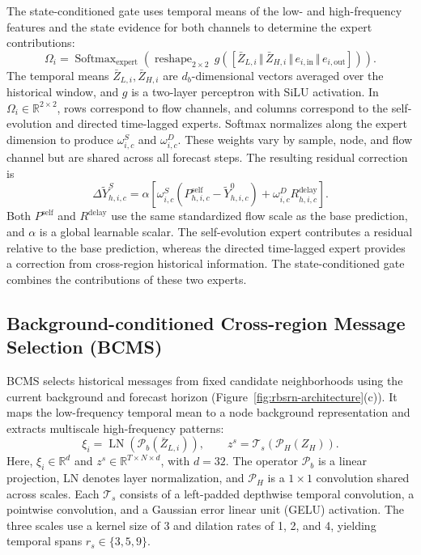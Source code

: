 The state-conditioned gate uses temporal means of the low- and high-frequency features and the state evidence for both channels to determine the expert contributions:
\begin{equation}
\label{eq:role-gate}
\Omega_i=\operatorname{Softmax}_{\mathrm{expert}}\!\left(
\operatorname{reshape}_{2\times2}\,g\!\left(
[\bar{Z}_{L,i}\,\Vert\,\bar{Z}_{H,i}\,\Vert\,e_{i,\mathrm{in}}\,\Vert\,e_{i,\mathrm{out}}]
\right)\right).
\end{equation}
The temporal means \(\bar{Z}_{L,i},\bar{Z}_{H,i}\) are \(d_b\)-dimensional vectors averaged over the historical window, and \(g\) is a two-layer perceptron with SiLU activation. In \(\Omega_i\in\mathbb{R}^{2\times2}\), rows correspond to flow channels, and columns correspond to the self-evolution and directed time-lagged experts. Softmax normalizes along the expert dimension to produce \(\omega^S_{i,c}\) and \(\omega^D_{i,c}\). These weights vary by sample, node, and flow channel but are shared across all forecast steps. The resulting residual correction is
\begin{equation}
\label{eq:serr-residual}
\Delta\widetilde{Y}^{S}_{h,i,c}
=\alpha\left[\omega^S_{i,c}\left(P^{\mathrm{self}}_{h,i,c}-\widetilde{Y}^{0}_{h,i,c}\right)
+\omega^D_{i,c}R^{\mathrm{delay}}_{h,i,c}\right].
\end{equation}
Both \(P^{\mathrm{self}}\) and \(R^{\mathrm{delay}}\) use the same standardized flow scale as the base prediction, and \(\alpha\) is a global learnable scalar. The self-evolution expert contributes a residual relative to the base prediction, whereas the directed time-lagged expert provides a correction from cross-region historical information. The state-conditioned gate combines the contributions of these two experts.

\subsection{Background-conditioned Cross-region Message Selection (BCMS)}\label{sec:bcms}

BCMS selects historical messages from fixed candidate neighborhoods using the current background and forecast horizon (Figure~\ref{fig:rbsrn-architecture}(c)). It maps the low-frequency temporal mean to a node background representation and extracts multiscale high-frequency patterns:
\begin{equation}
\label{eq:bcms-context-pattern}
\xi_i=\operatorname{LN}\!\left(\mathcal{P}_b(\bar{Z}_{L,i})\right),
\qquad z^s=\mathcal{T}_s\!\left(\mathcal{P}_H(Z_H)\right).
\end{equation}
Here, \(\xi_i\in\mathbb{R}^{d}\) and \(z^s\in\mathbb{R}^{T\times N\times d}\), with \(d=32\). The operator \(\mathcal{P}_b\) is a linear projection, LN denotes layer normalization, and \(\mathcal{P}_H\) is a \(1\times1\) convolution shared across scales. Each \(\mathcal{T}_s\) consists of a left-padded depthwise temporal convolution, a pointwise convolution, and a Gaussian error linear unit (GELU) activation. The three scales use a kernel size of 3 and dilation rates of 1, 2, and 4, yielding temporal spans \(r_s\in\{3,5,9\}\).

